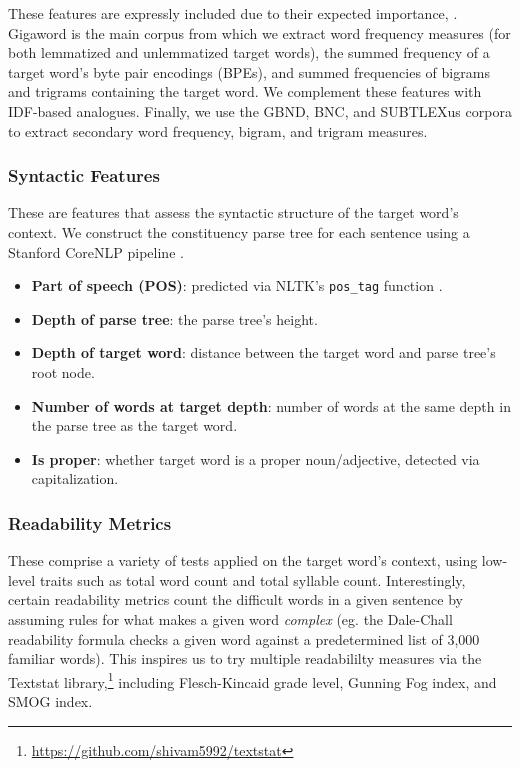 \documentclass{dcthesis}
\theoremstyle{definition}
\theoremstyle{remark}
\begin{document}
These features are expressly included due to their expected importance, \citep{zampieriEtAl:2017:NLPTEA}. Gigaword is the main corpus from which we extract word frequency measures (for both lemmatized and unlemmatized target words), the summed frequency of a target word's byte pair encodings (BPEs), and summed frequencies of bigrams and trigrams containing the target word. We complement these features with IDF-based analogues. Finally, we use the GBND, BNC, and SUBTLEXus corpora to extract secondary word frequency, bigram, and trigram measures. 

\subsubsection{Syntactic Features}

These are features that assess the syntactic structure of the target word's context. We construct the constituency parse tree for each sentence using a Stanford CoreNLP pipeline \citep{manning-EtAl:2014:P14-5}.

\begin{itemize}
  \item \textbf{Part of speech (POS)}: predicted via NLTK's \texttt{pos\_tag} function \citep{Loper02nltk:the}.
  \item \textbf{Depth of parse tree}: the parse tree's height.
  \item \textbf{Depth of target word}: distance between the target word and parse tree's root node.
  \item \textbf{Number of words at target depth}: number of words at the same depth in the parse tree as the target word.
  \item \textbf{Is proper}: whether target word is a proper noun/adjective, detected via capitalization.
\end{itemize}

\subsubsection{Readability Metrics}

These comprise a variety of tests applied on the target word's context, using low-level traits such as total word count and total syllable count. Interestingly, certain readability metrics count the difficult words in a given sentence by assuming rules for what makes a given word \textit{complex} (eg. the Dale-Chall readability formula \citep{10.2307/1473169} checks a given word against a predetermined list of 3,000 familiar words). This inspires us to try multiple readabililty measures via the Textstat library,\footnote{\url{https://github.com/shivam5992/textstat}} including Flesch-Kincaid grade level, Gunning Fog index, and SMOG index.
\end{document}
